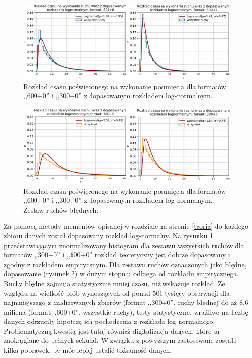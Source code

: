 \documentclass[inzynierska]{pwr_wmat_praca_dyplomowa}
\theoremstyle{plain}
\numberwithin{theorem}{chapter}
\theoremstyle{definition}
\numberwithin{theorem}{chapter}
\begin{document}
\begin{figure}[H]
	\centering
	\includegraphics[width=\textwidth]{rozklad_lognorm.png}
	\caption{Rozkład czasu poświęconego na wykonanie posunięcia dla formatów ,,600+0'' i ,,300+0'' z dopasowanym rozkładem log-normalnym.}
	\label{rys:rozklad_lognorm}
\end{figure}
\begin{figure}[H]
	\centering
	\includegraphics[width=\textwidth]{rozklad_lognorm2.png}
	\caption{Rozkład czasu poświęconego na wykonanie posunięcia dla formatów ,,600+0'' i ,,300+0'' z dopasowanym rozkładem log-normalnym. Zestaw ruchów błędnych.}
	\label{rys:rozklad_lognorm2}
\end{figure}
Za pomocą metody momentów opisanej w rozdziale na stronie \ref{teoria} do każdego zbioru danych został dopasowany rozkład log-normalny. Na rysunku \ref{rys:rozklad_lognorm} przedstawiającym znormalizowany histogram dla zestawu wszystkich ruchów dla formatów ,,300+0'' i ,,600+0'' rozkład teoretyczny jest dobrze dopasowany i zgodny z rozkładem empirycznym. Dla zestawu ruchów oznaczonych jako błędne, dopasowanie (rysunek \ref{rys:rozklad_lognorm2}) w dużym stopniu odbiega od rozkładu empirycznego. Ruchy błędne zajmują statystycznie mniej czasu, niż wskazuje rozkład. Ze względu na wielkość prób wynoszących od ponad 500 tysięcy obserwacji dla najmniejszego z analizowanych zbiorów (format ,,300+0'', ruchy błędne) do aż 8,6 miliona (format ,,600+0'', wszystkie ruchy), testy statystyczne, wrażliwe na liczbę danych odrzuciły hipotezę ich pochodzenia z rozkładu log-normalnego. Problematyczną kwestią jest tutaj również digitalizacja danych, które są zaokrąglane do pełnych sekund. W związku z powyższym zastosowane zostało kilka poprawek, by móc lepiej ustalić tożsamość danych.
\end{document}
